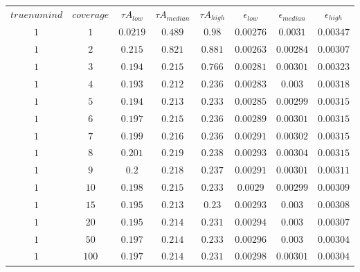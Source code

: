 \begin{table}[H]
\begin{tabular}{cccccccc}
$truenumind$ & $coverage$ & ${\tau}A_{low}$ & ${\tau}A_{median}$ & ${\tau}A_{high}$ & $\epsilon_{low}$ & $\epsilon_{median}$ & $\epsilon_{high}$\\
$1$ & $1$ & $0.0219$ & $0.489$ & $0.98$ & $0.00276$ & $0.0031$ & $0.00347$\\
$1$ & $2$ & $0.215$ & $0.821$ & $0.881$ & $0.00263$ & $0.00284$ & $0.00307$\\
$1$ & $3$ & $0.194$ & $0.215$ & $0.766$ & $0.00281$ & $0.00301$ & $0.00323$\\
$1$ & $4$ & $0.193$ & $0.212$ & $0.236$ & $0.00283$ & $0.003$ & $0.00318$\\
$1$ & $5$ & $0.194$ & $0.213$ & $0.233$ & $0.00285$ & $0.00299$ & $0.00315$\\
$1$ & $6$ & $0.197$ & $0.215$ & $0.236$ & $0.00289$ & $0.00301$ & $0.00315$\\
$1$ & $7$ & $0.199$ & $0.216$ & $0.236$ & $0.00291$ & $0.00302$ & $0.00315$\\
$1$ & $8$ & $0.201$ & $0.219$ & $0.238$ & $0.00293$ & $0.00304$ & $0.00315$\\
$1$ & $9$ & $0.2$ & $0.218$ & $0.237$ & $0.00291$ & $0.00301$ & $0.00311$\\
$1$ & $10$ & $0.198$ & $0.215$ & $0.233$ & $0.0029$ & $0.00299$ & $0.00309$\\
$1$ & $15$ & $0.195$ & $0.213$ & $0.23$ & $0.00293$ & $0.003$ & $0.00308$\\
$1$ & $20$ & $0.195$ & $0.214$ & $0.231$ & $0.00294$ & $0.003$ & $0.00307$\\
$1$ & $50$ & $0.197$ & $0.214$ & $0.233$ & $0.00296$ & $0.003$ & $0.00304$\\
$1$ & $100$ & $0.197$ & $0.214$ & $0.231$ & $0.00298$ & $0.00301$ & $0.00304$\\
\end{tabular}
\end{table}
 